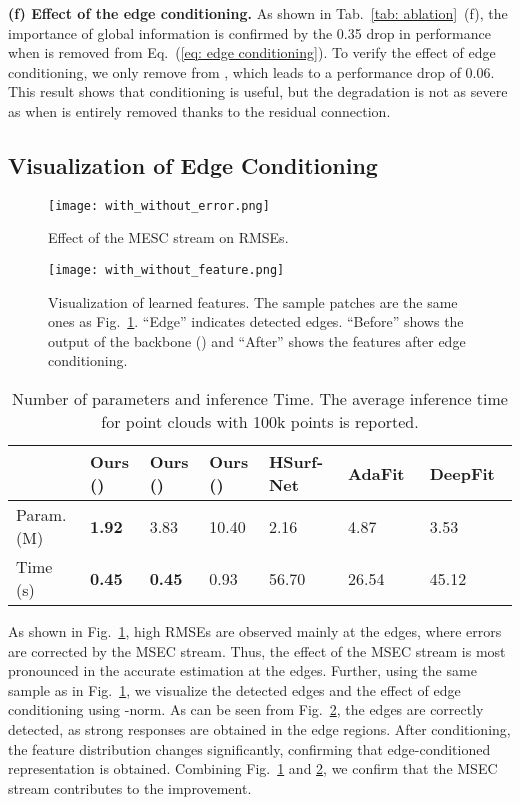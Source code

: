 \documentclass[sigconf]{acmart}
\begin{document}
\textbf{(f) Effect of the edge conditioning.}
As shown in Tab.~\ref{tab: ablation}~(f), the importance of global information
is confirmed by the 0.35 drop in performance when  is removed from Eq.~(\ref{eq: edge conditioning}). To verify the effect of edge conditioning, we only remove  from , which leads to a performance drop of 0.06. This result shows that conditioning is useful, but the degradation is not as severe as when  is entirely removed thanks to the residual connection.

\subsection{Visualization of Edge Conditioning}\label{sec: effect of edge conditioning}
\begin{figure}[t]
    \centering
    \texttt{[image: with\_without\_error.png]}
    \caption{Effect of the MESC stream on RMSEs.}
    \label{fig: with without error}
\end{figure}
\begin{figure}[t]
    \centering
    \texttt{[image: with\_without\_feature.png]}
    \caption{Visualization of learned features. The sample patches are the same ones as Fig.~\ref{fig: with without error}. ``Edge'' indicates detected edges. ``Before'' shows the output of the backbone () and ``After'' shows the features after edge conditioning.}
    \label{fig: with without feature}
\end{figure}
\begin{table*}[tb]
\small
\caption{Number of parameters and inference Time. The average inference time for point clouds with 100k points is reported.  }
\begin{tabular}{@{}lllllll@{}}
\toprule
              & Ours () & Ours () & Ours () & HSurf-Net~\cite{li2022hsurf} & AdaFit~\cite{zhu2021adafit} & DeepFit~\cite{ben2020deepfit} \\ \midrule
Param. (M) & \textbf{1.92} & 3.83 & 10.40 & 2.16      & 4.87   & 3.53    \\
Time (s)   & \textbf{0.45} & \textbf{0.45} & 0.93 & 56.70     & 26.54         & 45.12         \\ \bottomrule
\end{tabular}
\label{tab: efficiency}
\end{table*}
As shown in Fig.~\ref{fig: with without error}, high RMSEs are observed mainly at the edges, where errors are corrected by the MSEC stream. Thus, the effect of the MSEC stream is most pronounced in the accurate estimation at the edges.
Further, using the same sample as in Fig.~\ref{fig: with without error}, we visualize the detected edges and the effect of edge conditioning using -norm. As can be seen from Fig.~\ref{fig: with without feature}, the edges are correctly detected, as strong responses are obtained in the edge regions. After conditioning, the feature distribution changes significantly, confirming that edge-conditioned representation is obtained. Combining Fig.~\ref{fig: with without error} and \ref{fig: with without feature}, we confirm that the MSEC stream contributes to the improvement.
\end{document}
